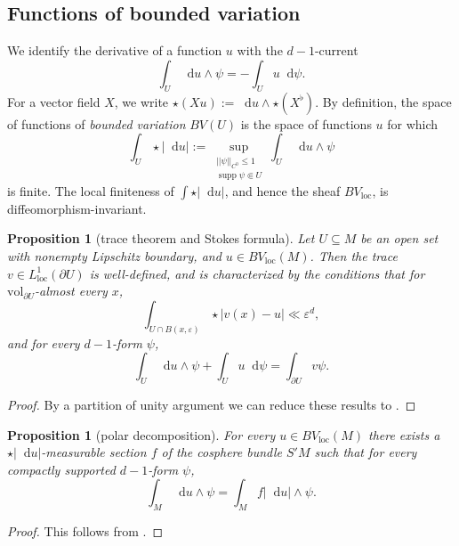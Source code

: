 \documentclass[reqno,10pt]{amsart}
\DeclareMathOperator{\supp}{supp}
\newcommand*\dif{\mathop{}\!\mathrm{d}}
\newcommand{\vol}{\mathrm{vol}}
\newcommand{\dfn}[1]{\emph{#1}\index{#1}}
\newcommand{\loc}{\mathrm{loc}}
\newtheorem{proposition}[theorem]{Proposition}
\theoremstyle{definition}
\numberwithin{equation}{section}
\begin{document}
\subsection{Functions of bounded variation}
We identify the derivative of a function $u$ with the $d-1$-current
$$\int_U \dif u \wedge \psi = -\int_U u \dif \psi.$$
For a vector field $X$, we write $\star (Xu) := \dif u \wedge \star (X^\flat)$.
By definition, the space of functions of \dfn{bounded variation} $BV(U)$ is the space of functions $u$ for which
\begin{equation}\label{total variation}
\int_U \star |\dif u| := \sup_{\substack{||\psi||_{C^0} \leq 1\\\supp \psi \Subset U}} \int_U \dif u \wedge \psi
\end{equation}
is finite.
The local finiteness of $\int \star |\dif u|$, and hence the sheaf $BV_\loc$, is diffeomorphism-invariant.

\begin{proposition}[trace theorem and Stokes formula]
Let $U \subseteq M$ be an open set with nonempty Lipschitz boundary, and $u \in BV_\loc(M)$.
Then the trace $v \in L^1_\loc(\partial U)$ is well-defined, and is characterized by the conditions that for $\vol_{\partial U}$-almost every $x$,
\begin{equation}\label{convergence of trace}
\int_{U \cap B(x, \varepsilon)} \star |v(x) - u| \ll \varepsilon^d,
\end{equation}
and for every $d - 1$-form $\psi$,
\begin{equation}\label{Miranda IBP}
\int_U \dif u \wedge \psi + \int_U u \dif \psi = \int_{\partial U} v\psi.
\end{equation}
\end{proposition}
\begin{proof}
By a partition of unity argument we can reduce these results to \cite[Teorema 1]{Miranda67}.
\end{proof}

\begin{proposition}[polar decomposition]
For every $u \in BV_\loc(M)$ there exists a $\star |\dif u|$-measurable section $f$ of the cosphere bundle $S'M$ such that for every compactly supported $d-1$-form $\psi$,
\begin{equation}\label{RNy formula}
\int_M \dif u \wedge \psi = \int_M f|\dif u| \wedge \psi.
\end{equation}
\end{proposition}
\begin{proof}
This follows from \cite[Theorem 4.14]{simon1983GMT}.
\end{proof}
\end{document}
